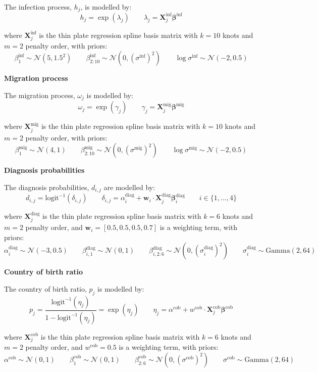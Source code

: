 \documentclass[11pt, a4paper]{article}
\begin{document}
The infection process, $h_j$, is modelled by:
%
\[
h_j = \exp(\lambda_j) \quad\quad
\lambda_j = \mathbf{X}^{\text{inf}}_j \boldsymbol{\beta}^{\text{inf}}
\]

where $\mathbf{X}^{\text{inf}}_j$ is the thin plate regression spline basis matrix with $k=10$ knots and $m=2$ penalty order, with priors:
%
\[
\beta^{\text{inf}}_1 \sim \mathcal{N}(5, 1.5^2) \quad\quad
\beta^{\text{inf}}_{2:10} \sim \mathcal{N}(0, (\sigma^{\text{inf}})^2) \quad\quad
\log \sigma^{\text{inf}} \sim \mathcal{N}(-2, 0.5)
\]

\textbf{Migration process}

The migration process, $\omega_j$ is modelled by:
%
\[
\omega_j = \exp(\gamma_j) \quad\quad
\gamma_j = \mathbf{X}^{\text{mig}}_j \boldsymbol{\beta}^{\text{mig}}
\]

where $\mathbf{X}^{\text{mig}}_j$ is the thin plate regression spline basis matrix with $k=10$ knots and $m=2$ penalty order, with priors:
%
\[
\beta^{\text{mig}}_1 \sim \mathcal{N}(4, 1) \quad\quad
\beta^{\text{mig}}_{2:10} \sim \mathcal{N}(0, (\sigma^{\text{mig}})^2) \quad\quad
\log \sigma^{\text{mig}} \sim \mathcal{N}(-2, 0.5)
\]

\textbf{Diagnosis probabilities}

The diagnosis probabilities, $d_{i,j}$ are modelled by:
%
\[
d_{i,j} = \text{logit}^{-1}(\delta_{i,j}) \quad\quad 
\delta_{i,j} = \alpha^{\text{diag}}_i + \mathbf{w}_i \cdot \mathbf{X}^{\text{diag}}_j \boldsymbol{\beta}^{\text{diag}}_i \quad\quad
i \in \{1, \ldots, 4\}
\]

where $\mathbf{X}^{\text{diag}}_j$ is the thin plate regression spline basis matrix with $k=6$ knots and $m=2$ penalty order, and $\mathbf{w}_i = [0.5, 0.5, 0.5, 0.7]$ is a weighting term, with priors:
%
\[
\alpha^{\text{diag}}_i \sim \mathcal{N}(-3, 0.5) \quad\quad
\beta^{\text{diag}}_{i,1} \sim \mathcal{N}(0, 1) \quad\quad
\beta^{\text{diag}}_{i,2:6} \sim \mathcal{N}(0, (\sigma^{\text{diag}}_i)^2) \quad\quad
\sigma^{\text{diag}}_i \sim \text{Gamma}(2, 64)
\]

\textbf{Country of birth ratio}

The country of birth ratio, $p_j$ is modelled by:
%
\[
p_j = \frac{\text{logit}^{-1}(\eta_j)}{1 - \text{logit}^{-1}(\eta_j)} = \exp(\eta_j)\quad\quad
\eta_j = \alpha^{\text{cob}} + w^{\text{cob}} \cdot \mathbf{X}^{\text{cob}}_j \boldsymbol{\beta}^{\text{cob}}
\]

where $\mathbf{X}^{\text{cob}}_j$ is the thin plate regression spline basis matrix with $k=6$ knots and $m=2$ penalty order, and $w^{\text{cob}} = 0.5$ is a weighting term, with priors:
%
\[
\alpha^{\text{cob}} \sim \mathcal{N}(0, 1) \quad\quad
\beta^{\text{cob}}_1 \sim \mathcal{N}(0, 1) \quad\quad
\beta^{\text{cob}}_{2:6} \sim \mathcal{N}(0, (\sigma^{\text{cob}})^2) \quad\quad
\sigma^{\text{cob}} \sim \text{Gamma}(2, 64)
\]
\end{document}
